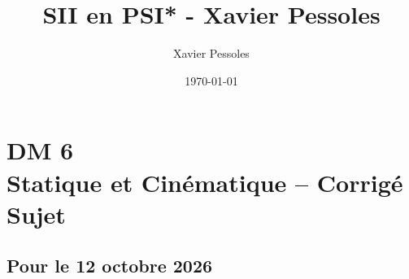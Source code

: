 \documentclass[
	fontsize=10pt, %
	twoside=false, %
]{kaobook}
\newcommand{\repRel}{../../../..}
\newcommand{\repStyle}{\repRel/Style}
\begin{document}

\titlehead{Document Template}
\title[SII en PSI* - Xavier Pessoles]{SII en PSI* - Xavier Pessoles}
\author[XP]{Xavier Pessoles}
\date{\today}

%
\frontmatter %


%
\mainmatter %


\setcounter{margintocdepth}{\sectiontocdepth}
\graphicspath{{\repStyle/png}}

\pagestyle{xp.scrheadings}



\newcommand{\repExo}{}
\newcommand{\nomExo}{}

\livretfalse %
\proftrue
\collefalse\colletrue
\normaltrue

\newcommand{\exer}{\subsection*}

\chapter*{DM 6 \\ 
Statique et Cinématique -- 
\ifprof Corrigé \else Sujet \fi}


\section*{Pour le 12 octobre 2026}



\graphicspath{{\repStyle/png/}{\repExo/images/}{images/}}

\end{document}
